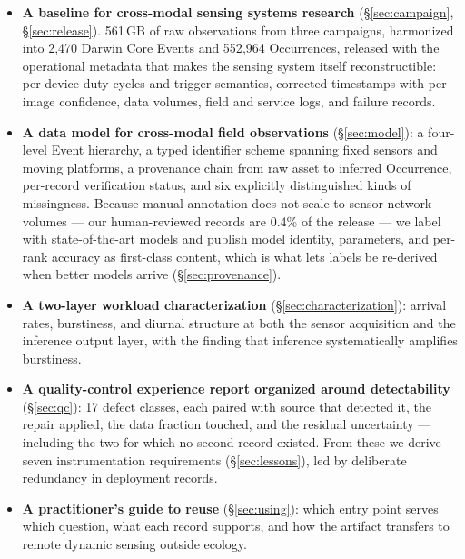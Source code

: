 \documentclass[sigconf]{acmart}
\begin{document}
\begin{itemize}
    \item \textbf{A baseline for cross-modal sensing systems research}
    (\S\ref{sec:campaign}, \S\ref{sec:release}). 561\,GB of raw
    observations from three campaigns, harmonized into 2{,}470 Darwin
    Core Events and 552{,}964 Occurrences, released with the operational
    metadata that makes the sensing system itself reconstructible:
    per-device duty cycles and trigger semantics, corrected timestamps
    with per-image confidence, data volumes, field and service logs, and
    failure records.

    \item \textbf{A data model for cross-modal field observations}
    (\S\ref{sec:model}): a four-level Event hierarchy, a typed
    identifier scheme spanning fixed sensors and moving platforms, a
    provenance chain from raw asset to inferred Occurrence, per-record
    verification status, and six explicitly distinguished kinds of
    missingness. Because manual annotation does not scale to
    sensor-network volumes --- our human-reviewed records are 0.4\% of
    the release --- we label with state-of-the-art models and publish
    model identity, parameters, and per-rank accuracy as first-class
    content, which is what lets labels be re-derived when better models
    arrive (\S\ref{sec:provenance}).

    \item \textbf{A two-layer workload characterization}
    (\S\ref{sec:characterization}): arrival rates, burstiness, and
    diurnal structure at both the sensor acquisition and the inference
    output layer, with the finding that inference systematically
    amplifies burstiness.

    \item \textbf{A quality-control experience report organized around
    detectability} (\S\ref{sec:qc}): 17 defect classes, each paired with
    source that detected it, the repair applied, the data
    fraction touched, and the residual uncertainty --- including the two
    for which no second record existed. From these we derive seven
    instrumentation requirements (\S\ref{sec:lessons}), led by
    deliberate redundancy in deployment records.

    \item \textbf{A practitioner's guide to reuse}
    (\S\ref{sec:using}): which entry point serves which question, what
    each record supports, and how the artifact transfers to remote
    dynamic sensing outside ecology.
\end{itemize}
\end{document}
